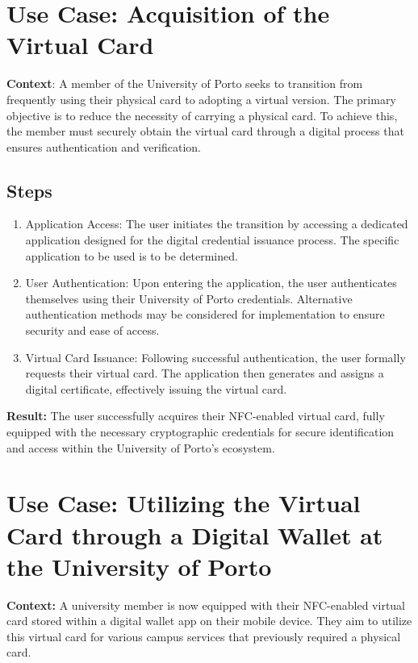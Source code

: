 \documentclass{article}
\begin{document}
\section*{Use Case: Acquisition of the Virtual Card}
\textbf{Context}: A member of the University of Porto seeks to transition from frequently using their physical card to adopting a virtual version. The primary objective is to reduce the necessity of carrying a physical card. To achieve this, the member must securely obtain the virtual card through a digital process that ensures authentication and verification.

\subsection*{Steps}
\begin{enumerate}
    \item Application Access: The user initiates the transition by accessing a dedicated application designed for the digital credential issuance process. The specific application to be used is to be determined.
    \item User Authentication: Upon entering the application, the user authenticates themselves using their University of Porto credentials. Alternative authentication methods may be considered for implementation to ensure security and ease of access.
    \item Virtual Card Issuance: Following successful authentication, the user formally requests their virtual card. The application then generates and assigns a digital certificate, effectively issuing the virtual card.
\end{enumerate}

\textbf{Result:} The user successfully acquires their NFC-enabled virtual card, fully equipped with the necessary cryptographic credentials for secure identification and access within the University of Porto's ecosystem.

\section*{Use Case: Utilizing the Virtual Card through a Digital Wallet at the University of Porto}

\textbf{Context:} A university member is now equipped with their NFC-enabled virtual card stored within a digital wallet app on their mobile device. They aim to utilize this virtual card for various campus services that previously required a physical card.
\end{document}
